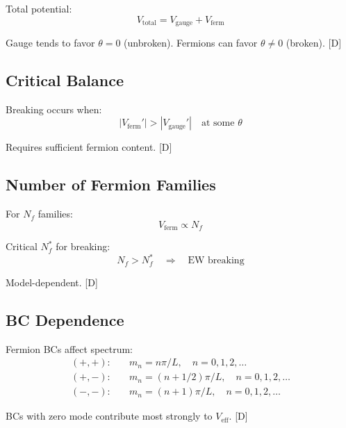 \documentclass[11pt,a4paper]{article}
\newcommand{\tagD}{\textcolor{blue!70!black}{[D]}}
\begin{document}
Total potential:
\begin{equation}
\label{eq:total-competition}
V_{\text{total}} = V_{\text{gauge}} + V_{\text{ferm}}
\end{equation}

Gauge tends to favor $\theta = 0$ (unbroken).
Fermions can favor $\theta \neq 0$ (broken). \tagD

\subsection{Critical Balance}

Breaking occurs when:
\begin{equation}
\label{eq:critical-balance}
|V_{\text{ferm}}'| > |V_{\text{gauge}}'| \quad \text{at some } \theta
\end{equation}

Requires sufficient fermion content. \tagD

\subsection{Number of Fermion Families}

For $N_f$ families:
\begin{equation}
\label{eq:nf-scaling}
V_{\text{ferm}} \propto N_f
\end{equation}

Critical $N_f^*$ for breaking:
\begin{equation}
\label{eq:nf-critical}
N_f > N_f^* \quad \Rightarrow \quad \text{EW breaking}
\end{equation}

Model-dependent. \tagD

\subsection{BC Dependence}

Fermion BCs affect spectrum:
\begin{align}
\label{eq:bc-pp}
(+, +): \quad & m_n = n\pi/L, \quad n = 0, 1, 2, \ldots \\
\label{eq:bc-pm}
(+, -): \quad & m_n = (n + 1/2)\pi/L, \quad n = 0, 1, 2, \ldots \\
\label{eq:bc-mm}
(-, -): \quad & m_n = (n+1)\pi/L, \quad n = 0, 1, 2, \ldots
\end{align}

BCs with zero mode contribute most strongly to $V_{\text{eff}}$. \tagD
\end{document}
